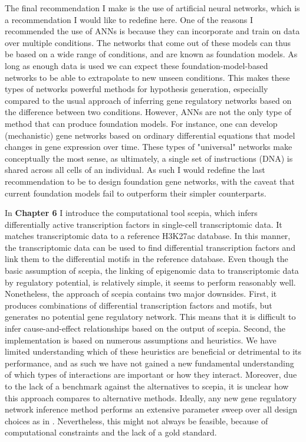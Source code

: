 The final recommendation I make is the use of artificial neural networks, which is a recommendation I would like to redefine here. One of the reasons I recommended the use of ANNs is because they can incorporate and train on data over multiple conditions. The networks that come out of these models can thus be based on a wide range of conditions, and are known as foundation models. As long as enough data is used we can expect these foundation-model-based networks to be able to extrapolate to new unseen conditions\cite{Schreiber2020_avocado}. This makes these types of networks powerful methods for hypothesis generation, especially compared to the usual approach of inferring gene regulatory networks based on the difference between two conditions. However, ANNs are not the only type of method that can produce foundation models. For instance, one can develop (mechanistic) gene networks based on ordinary differential equations that model changes in gene expression over time\cite{Ventre_2022}. These types of "universal" networks make conceptually the most sense, as ultimately, a single set of instructions (DNA) is shared across all cells of an individual. As such I would redefine the last recommendation to be to design foundation gene networks, with the caveat that current foundation models fail to outperform their simpler counterparts\cite{Kedzierska2023}.

In \textbf{Chapter 6} I introduce the computational tool scepia, which infers differentially active transcription factors in single-cell transcriptomic data. It matches transcriptomic data to a reference H3K27ac database. In this manner, the transcriptomic data can be used to find differential transcription factors and link them to the differential motifs in the reference database. Even though the basic assumption of scepia, the linking of epigenomic data to transcriptomic data by regulatory potential\cite{Wang2016}, is relatively simple, it seems to perform reasonably well. Nonetheless, the approach of scepia contains two major downsides. First, it produces combinations of differential transcription factors and motifs, but generates no potential gene regulatory network. This means that it is difficult to infer cause-and-effect relationships based on the output of scepia. Second, the implementation is based on numerous assumptions and heuristics. We have limited understanding which of these heuristics are beneficial or detrimental to its performance, and as such we have not gained a new fundamental understanding of which types of interactions are important or how they interact. Moreover, due to the lack of a benchmark against the alternatives to scepia\cite{Aibar_2017,Dong2022}, it is unclear how this approach compares to alternative methods. Ideally, any new gene regulatory network inference method performs an extensive parameter sweep over all design choices as in \cite{Gschwind2023}. Nevertheless, this might not always be feasible, because of computational constraints and the lack of a gold standard.

